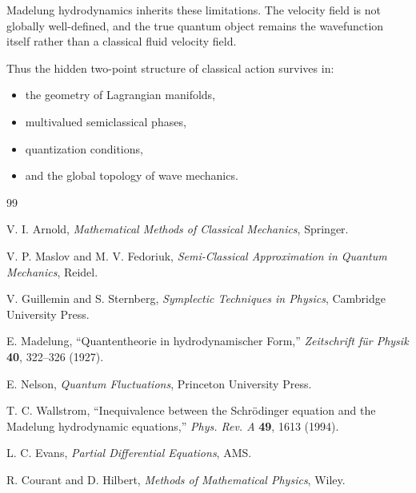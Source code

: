\documentclass[11pt]{article}
\begin{document}
Madelung hydrodynamics inherits these limitations. The velocity field is not globally well-defined, and the true quantum object remains the wavefunction itself rather than a classical fluid velocity field.

Thus the hidden two-point structure of classical action survives in:
\begin{itemize}
\item the geometry of Lagrangian manifolds,
\item multivalued semiclassical phases,
\item quantization conditions,
\item and the global topology of wave mechanics.
\end{itemize}

\begin{thebibliography}{99}

V. I. Arnold,
\textit{Mathematical Methods of Classical Mechanics},
Springer.

V. P. Maslov and M. V. Fedoriuk,
\textit{Semi-Classical Approximation in Quantum Mechanics},
Reidel.

V. Guillemin and S. Sternberg,
\textit{Symplectic Techniques in Physics},
Cambridge University Press.

E. Madelung,
``Quantentheorie in hydrodynamischer Form,''
\textit{Zeitschrift f\"ur Physik} \textbf{40}, 322--326 (1927).

E. Nelson,
\textit{Quantum Fluctuations},
Princeton University Press.

T. C. Wallstrom,
``Inequivalence between the Schr\"odinger equation and the Madelung hydrodynamic equations,''
\textit{Phys. Rev. A} \textbf{49}, 1613 (1994).

L. C. Evans,
\textit{Partial Differential Equations},
AMS.

R. Courant and D. Hilbert,
\textit{Methods of Mathematical Physics},
Wiley.

\end{thebibliography}
\end{document}
